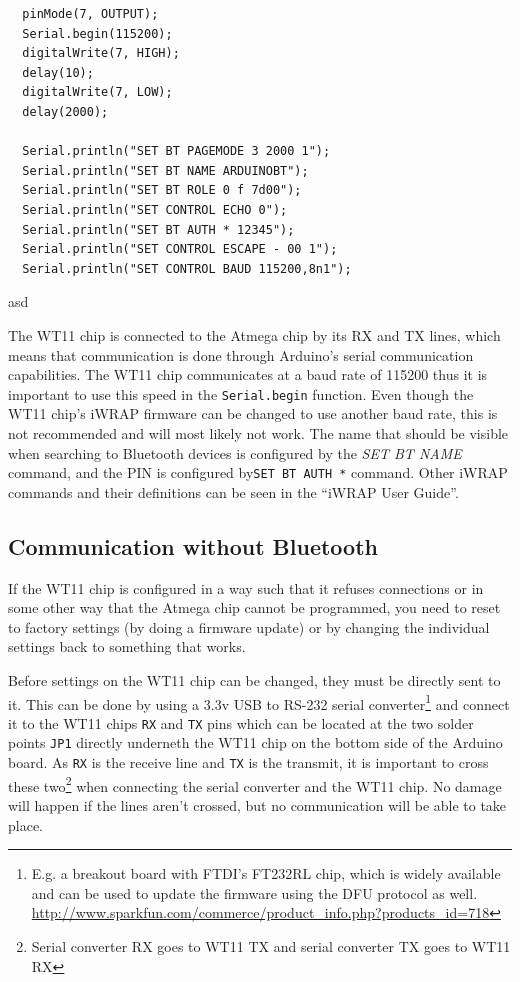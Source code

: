 \documentclass[a4paper, oneside, final]{memoir}
\begin{document}
\begin{table}
  \centering
\begin{verbatim}
  pinMode(7, OUTPUT);
  Serial.begin(115200);
  digitalWrite(7, HIGH);
  delay(10);
  digitalWrite(7, LOW);
  delay(2000);

  Serial.println("SET BT PAGEMODE 3 2000 1");
  Serial.println("SET BT NAME ARDUINOBT");
  Serial.println("SET BT ROLE 0 f 7d00");
  Serial.println("SET CONTROL ECHO 0");
  Serial.println("SET BT AUTH * 12345");
  Serial.println("SET CONTROL ESCAPE - 00 1");
  Serial.println("SET CONTROL BAUD 115200,8n1");
\end{verbatim}
  \caption{asd}
  \label{tab:ArduinoBT:Initial_Setup_code}
\end{table}


The WT11 chip is connected to the Atmega chip by its RX and TX lines, which
means that communication is done through Arduino's serial communication
capabilities. The WT11 chip communicates at a baud rate of 115200 thus it is
important to use this speed in the \texttt{Serial.begin} function. Even though
the WT11 chip's iWRAP firmware can be changed to use another baud rate, this is
not recommended and will most likely not work. The name that should be visible
when searching to Bluetooth devices is configured by the \textit{SET BT NAME}
command, and the PIN is configured by\texttt{SET BT AUTH *} command. Other iWRAP
commands and their definitions can be seen in the ``iWRAP User Guide''.

\subsection{Communication without Bluetooth}

If the WT11 chip is configured in a way such that it refuses connections or in
some other way that the Atmega chip cannot be programmed, you need to reset to
factory settings (by doing a firmware update) or by changing the individual
settings back to something that works. 

Before settings on the WT11 chip can be changed, they must be directly sent to
it. This can be done by using a 3.3v USB to RS-232 serial converter\footnote{E.g. a
  breakout board with FTDI's FT232RL chip, which is widely available and can be
  used to update the firmware using the DFU protocol as well.
  \url{http://www.sparkfun.com/commerce/product_info.php?products_id=718}} and
connect it to the WT11 chips \texttt{RX} and \texttt{TX} pins which can be
located at the two solder points \texttt{JP1} directly underneth the WT11 chip
on the bottom side of the Arduino board. As \texttt{RX} is the receive line and
\texttt{TX} is the transmit, it is important to cross these two\footnote{Serial
  converter RX goes to WT11 TX and serial converter TX goes to WT11 RX} when
connecting the serial converter and the WT11 chip. No damage will happen if the
lines aren't crossed, but no communication will be able to take place.
\end{document}
